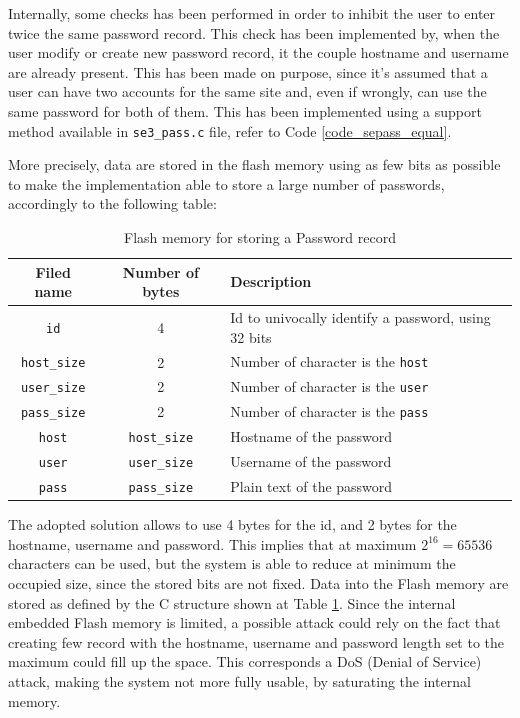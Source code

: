 Internally, some checks has been performed in order to inhibit the user to enter twice the same password record. This check has been implemented by, when the user modify or create new password record, it the couple hostname and username are already present. This has been made on purpose, since it's assumed that a user can have two accounts for the same site and, even if wrongly, can use the same password for both of them. This has been implemented using a support method available in \texttt{se3\_pass.c} file, refer to Code \ref{code_sepass_equal}.

More precisely, data are stored in the flash memory using as few bits as possible to make the implementation able to store a large number of passwords, accordingly to the following table:
\begin{table}[H]
	\begin{tabular}{ c c l }
		\textbf{Filed name} & \textbf{Number of bytes} & \textbf{Description}\\ 
		\hline
		\texttt{id} & 4 & Id to univocally identify a password, using 32 bits\\ 
		\hline
		\texttt{host\_size} & 2 & Number of character is the \texttt{host} \\  
		\hline
		\texttt{user\_size} & 2 &  Number of character is the \texttt{user} \\  
		\hline
		\texttt{pass\_size} & 2 &  Number of character is the \texttt{pass} \\  
		\hline
		\texttt{host} & \texttt{host\_size} & Hostname of the password \\  
		\hline
		\texttt{user} & \texttt{user\_size} & Username of the password \\  
		\hline
		\texttt{pass} & \texttt{pass\_size} & Plain text of the password \\  
		\hline
	\end{tabular}
\caption{Flash memory for storing a Password record}
\label{tab:flashmem_pass}
\end{table}

The adopted solution allows to use 4 bytes for the id, and 2 bytes for the hostname, username and password. This implies that at maximum $2^{16} = 65536$ characters can be used, but the system is able to reduce at minimum the occupied size, since the stored bits are not fixed.\newline\newline
Data into the Flash memory are stored as defined by the C structure shown at Table \ref{tab:flashmem_pass}. Since the internal embedded Flash memory is limited, a possible attack could rely on the fact that creating few record with the hostname, username and password length set to the maximum could fill up the space. This corresponds a DoS (Denial of Service) attack, making the system not more fully usable, by saturating the internal memory.

